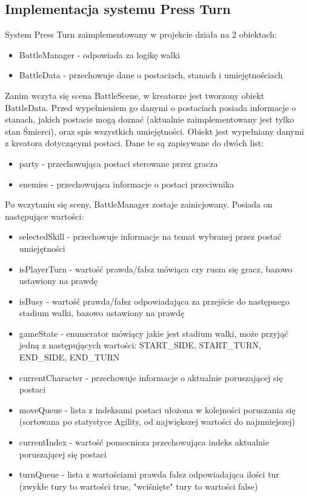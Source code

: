 \documentclass{SGGW-thesis}
\begin{document}
\subsection{Implementacja systemu Press Turn}
System Press Turn zaimplementowany w projekcie działa na 2 obiektach:
\begin{itemize}
  \item{BattleManager - odpowiada za logikę walki}
  \item{BattleData - przechowuje dane o postaciach, stanach i umiejętnościach}
\end{itemize}
Zanim wczyta się scena BattleScene, w kreatorze jest tworzony obiekt BattleData. Przed wypełnieniem go danymi o postaciach posiada informacje o stanach, 
jakich postacie mogą doznać (aktualnie zaimplementowany jest tylko stan Śmierci), oraz spis wszystkich umiejętności. Obiekt jest wypełniany danymi z
kreatora dotyczącymi postaci. Dane te są zapisywane do dwóch list:
\begin{itemize}
  \item{party - przechowująca postaci sterowane przez gracza}
  \item{enemies - przechowująca informacje o postaci przeciwnika}
\end{itemize}
Po wczytaniu się sceny, BattleManager zostaje zainicjowany. Posiada on następujące wartości:
\begin{itemize}
  \item{selectedSkill - przechowuje informacje na temat wybranej przez postać umiejętności}
  \item{isPlayerTurn - wartość prawda/fałsz mówiąca czy rusza się gracz, bazowo ustawiony na prawdę}
  \item{isBusy - wartość prawda/fałsz odpowiadająca za przejście do następnego stadium walki, bazowo ustawiony na prawdę}
  \item{gameState - enumerator mówiący jakie jest stadium walki, może przyjąć jedną z następujących wartości: START\_SIDE, START\_TURN, END\_SIDE, END\_TURN}
  \item{currentCharacter - przechowuje informacje o aktualnie poruszającej się postaci}
  \item{moveQueue - lista z indeksami postaci ułożona w kolejności poruszania się (sortowana po statystyce Agility, od największej wartości do najmniejszej)}
  \item{currentIndex - wartość pomocnicza przechowująca indeks aktualnie poruszającej się postaci}
  \item{turnQueue - lista z wartościami prawda fałsz odpowiadająca ilości tur (zwykłe tury to wartości true, "wciśnięte" tury to wartości false)}
\end{itemize}
\end{document}
